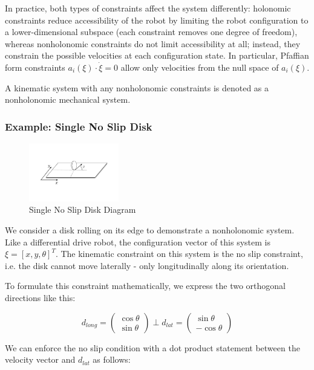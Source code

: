 \documentclass[twoside]{article}
\begin{document}
In practice, both types of constraints affect the system differently: holonomic constraints reduce accessibility of the robot by limiting the robot configuration to a lower-dimensional subspace (each constraint removes one degree of freedom), whereas nonholonomic constraints do not limit accessibility at all; instead, they constrain the possible velocities at each configuration state. In particular, Pfaffian form constraints $ a_i(\xi) \cdot \dot{\xi} = 0 $ allow only velocities from the null space of $ a_i (\xi) $. 

A kinematic system with any nonholonomic constraints is denoted as a nonholonomic mechanical system.

\subsubsection*{Example: Single No Slip Disk \cite{ssvo}}

\begin{figure}[H]
\centering
\includegraphics[width=0.35\textwidth]{Slip_Disk_Example}
\caption{Single No Slip Disk Diagram}
\end{figure}

We consider a disk rolling on its edge to demonstrate a nonholonomic system. Like a differential drive robot, the configuration vector of this system is $ \xi = [x, y, \theta]^T $. The kinematic constraint on this system is the no slip constraint, i.e. the disk cannot move laterally - only longitudinally along its orientation.

To formulate this constraint mathematically, we express the two orthogonal directions like this:

\[ d_{long} =
\begin{pmatrix} \cos \theta \\ \sin \theta \end{pmatrix}
\perp
d_{lat} =
\begin{pmatrix} \sin \theta \\ -\cos \theta \end{pmatrix}
\]

We can enforce the no slip condition with a dot product statement between the velocity vector and $ d_{lat} $ as follows:
\end{document}
